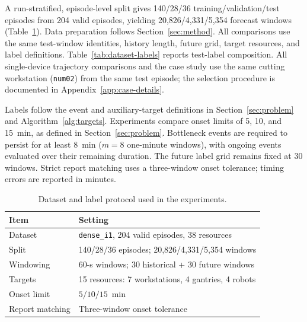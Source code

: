 \documentclass[a4paper,fleqn]{cas-dc}
\begin{document}
A run-stratified, episode-level split gives 140/28/36 training/validation/test episodes from 204 valid episodes, yielding 20,826/4,331/5,354 forecast windows (Table~\ref{tab:exp-dataset}). Data preparation follows Section~\ref{sec:method}. All comparisons use the same test-window identities, history length, future grid, target resources, and label definitions. Table~\ref{tab:dataset-labels} reports test-label composition. All single-device trajectory comparisons and the case study use the same cutting workstation (\texttt{num02}) from the same test episode; the selection procedure is documented in Appendix~\ref{app:case-details}.



Labels follow the event and auxiliary-target definitions in Section~\ref{sec:problem} and Algorithm~\ref{alg:targets}. Experiments compare onset limits of 5, 10, and 15~min, as defined in Section~\ref{sec:problem}. Bottleneck events are required to persist for at least 8~min ($m=8$ one-minute windows), with ongoing events evaluated over their remaining duration. The future label grid remains fixed at 30 windows. Strict report matching uses a three-window onset tolerance; timing errors are reported in minutes.

\begin{table}[pos=!htbp]
\centering
\caption{Dataset and label protocol used in the experiments.}
\label{tab:exp-dataset}
\scriptsize
\setlength{\tabcolsep}{4pt}
\renewcommand{\arraystretch}{1.08}
\begin{tabularx}{\columnwidth}{@{}lX@{}}
\toprule
Item & Setting \\
\midrule
Dataset & \texttt{dense\_i1}, 204 valid episodes, 38 resources \\
Split & 140/28/36 episodes; 20,826/4,331/5,354 windows \\
Windowing & 60-s windows; 30 historical + 30 future windows \\
Targets & 15 resources: 7 workstations, 4 gantries, 4 robots \\
Onset limit & $5/10/15$~min \\
Report matching & Three-window onset tolerance \\
\bottomrule
\end{tabularx}
\end{table}
\end{document}
